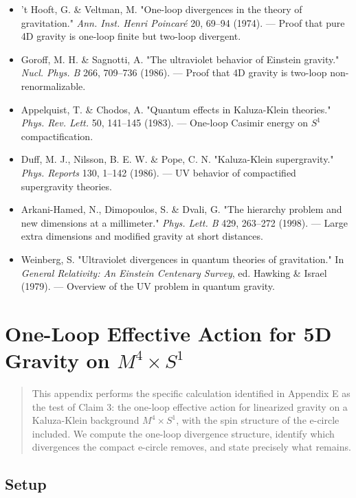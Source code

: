 \documentclass[aps,prd,preprint,superscriptaddress,longbibliography,floatfix]{revtex4-2}
\theoremstyle{remark}
\begin{document}
\begin{itemize}
  \item 't Hooft, G. \& Veltman, M. "One-loop divergences in the theory of gravitation." \textit{Ann. Inst. Henri Poincar\'{e}} 20, 69--94 (1974). --- Proof that pure 4D gravity is one-loop finite but two-loop divergent.
  \item Goroff, M. H. \& Sagnotti, A. "The ultraviolet behavior of Einstein gravity." \textit{Nucl. Phys. B} 266, 709--736 (1986). --- Proof that 4D gravity is two-loop non-renormalizable.
  \item Appelquist, T. \& Chodos, A. "Quantum effects in Kaluza-Klein theories." \textit{Phys. Rev. Lett.} 50, 141--145 (1983). --- One-loop Casimir energy on $S^{1}$ compactification.
  \item Duff, M. J., Nilsson, B. E. W. \& Pope, C. N. "Kaluza-Klein supergravity." \textit{Phys. Reports} 130, 1--142 (1986). --- UV behavior of compactified supergravity theories.
  \item Arkani-Hamed, N., Dimopoulos, S. \& Dvali, G. "The hierarchy problem and new dimensions at a millimeter." \textit{Phys. Lett. B} 429, 263--272 (1998). --- Large extra dimensions and modified gravity at short distances.
  \item Weinberg, S. "Ultraviolet divergences in quantum theories of gravitation." In \textit{General Relativity: An Einstein Centenary Survey}, ed. Hawking \& Israel (1979). --- Overview of the UV problem in quantum gravity.
\end{itemize}


\section{One-Loop Effective Action for 5D Gravity on $M^4 \times S^1$}


\begin{quote}
This appendix performs the specific calculation identified in Appendix E
as the test of Claim 3: the one-loop effective action for linearized gravity
on a Kaluza-Klein background $M^{4} \times S^{1}$, with the spin structure of the
e-circle included. We compute the one-loop divergence structure, identify
which divergences the compact e-circle removes, and state precisely what
remains.
\end{quote}



\subsection{Setup}
\end{document}
